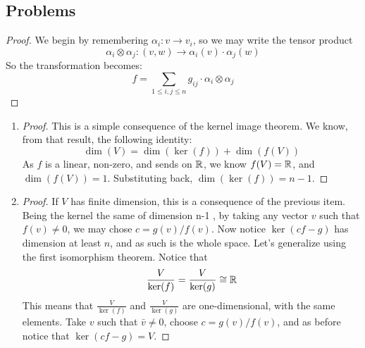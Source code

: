 \subsection{Problems}
\begin{problem}
\end{problem}

\begin{proof}
	We begin by remembering $\alpha_i: v \to v_i$, so we may write the tensor product
	$$\alpha_i \otimes \alpha_j: (v,w) \to \alpha_i(v)\cdot \alpha_j(w)$$
	So the transformation becomes:
	$$f = \sum_{1 \leq i,j \leq n} g_{ij} \cdot \alpha_i \otimes \alpha_j$$
\end{proof}

\begin{problem}
\end{problem}
\begin{enumerate}[label=(\alph*)]
	\item \begin{proof}
		      This is a simple consequence of the kernel image theorem. We know, from that result, the following identity:
		      $$\dim(V) = \dim(\ker(f)) + \dim(f(V))$$
		      As $f$ is a linear, non-zero, and sends on $\mathbb{R}$, we know $f(V) = \mathbb{R}$, and $\dim(f(V)) = 1$. Substituting back,
		      $\dim(\ker(f)) = n - 1$.
	      \end{proof}
	\item \begin{proof}
		      If $V$ has finite dimension, this is a consequence of the previous item. Being the kernel the same of dimension n-1 ,
		      by taking any vector $v$  such that $f(v) \neq 0$, we may chose $c = g(v)/f(v)$. Now notice $\ker(cf - g)$ has dimension
		      at least $n$, and as such is the whole space. Let's generalize using the first isomorphism theorem. Notice that
		      $$\frac{V}{\ker(f)} = \frac{V}{\ker(g)} \cong \mathbb{R}$$
		      This means that $\frac{V}{\ker(f)}$ and $\frac{V}{\ker(g)}$ are one-dimensional, with the same elements. Take
		      $v$ such that $\bar{v} \neq 0$, choose $c = g(v)/f(v)$, and as before notice that $\ker(cf - g) = V$.
	      \end{proof}
\end{enumerate}

